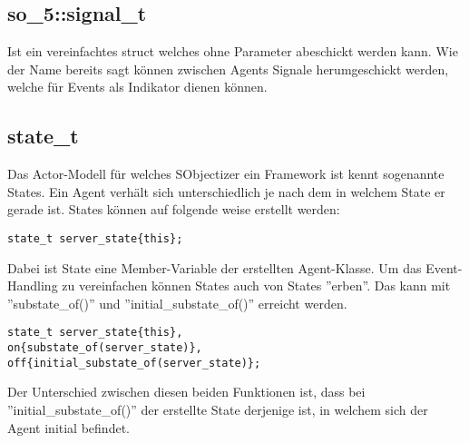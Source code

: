 \subsection{so\_5::signal\_t}
Ist ein vereinfachtes struct welches ohne Parameter abeschickt werden kann. Wie der Name bereits sagt können
zwischen Agents Signale herumgeschickt werden, welche für Events als Indikator dienen können.

\subsection{state\_t}
Das Actor-Modell für welches SObjectizer ein Framework ist kennt sogenannte States. Ein Agent verhält sich
unterschiedlich je nach dem in welchem State er gerade ist.
States können auf folgende weise erstellt werden:
\begin{verbatim}
state_t server_state{this};
\end{verbatim}
Dabei ist State eine Member-Variable der erstellten Agent-Klasse.
Um das Event-Handling zu vereinfachen können States auch von States ''erben''.
Das kann mit ''substate\_of()'' und ''initial\_substate\_of()'' erreicht werden.
\begin{verbatim}
state_t server_state{this},
on{substate_of(server_state)},
off{initial_substate_of(server_state)};
\end{verbatim}
Der Unterschied zwischen diesen beiden Funktionen ist, dass bei ''initial\_substate\_of()'' der erstellte State
derjenige ist, in welchem sich der Agent initial befindet.

